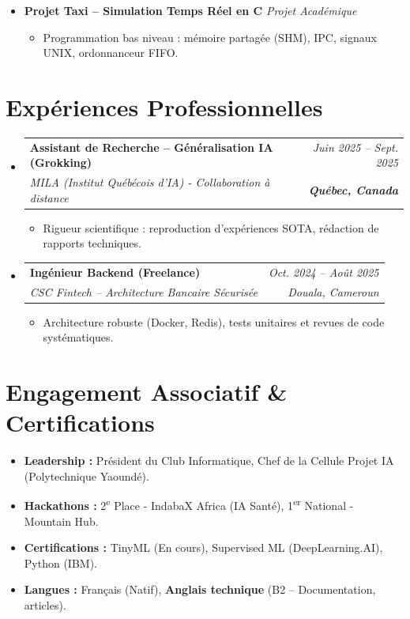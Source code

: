 \documentclass[a4paper,11pt]{article}
\makeatletter
\newcommand{\resumeSubheading}[4]{
  \vspace{-1pt}\item
    \begin{tabular*}{0.97\textwidth}[t]{l@{\extracolsep{\fill}}r}
      \textbf{#1} & \textit{\small #2} \\
      \textit{\small #3} & \textit{\small #4} \\
    \end{tabular*}\vspace{-5pt}
}
\makeatother
\begin{document}
\begin{itemize}[leftmargin=*, label={}]
\item \textbf{Projet Taxi -- Simulation Temps Réel en C} \hfill \textit{Projet Académique}
    \begin{itemize}[leftmargin=0.4cm, nosep, label=\tiny$\bullet$]
        \item \small{Programmation bas niveau : mémoire partagée (SHM), IPC, signaux UNIX, ordonnanceur FIFO.}
    \end{itemize}

\end{itemize}

\section{Expériences Professionnelles}
\begin{itemize}[leftmargin=*, label={}]

    \resumeSubheading
      {Assistant de Recherche -- Généralisation IA (Grokking)}{Juin 2025 -- Sept. 2025}
      {MILA (Institut Québécois d'IA) - Collaboration à distance}{\textbf{Québec, Canada}}
      \begin{itemize}[leftmargin=0.4cm, nosep, label=\tiny$\bullet$]
        \item \small{Rigueur scientifique : reproduction d'expériences SOTA, rédaction de rapports techniques.}
      \end{itemize}
    \vspace{2pt}

    \resumeSubheading
      {Ingénieur Backend (Freelance)}{Oct. 2024 -- Août 2025}
      {CSC Fintech -- Architecture Bancaire Sécurisée}{Douala, Cameroun}
      \begin{itemize}[leftmargin=0.4cm, nosep, label=\tiny$\bullet$]
        \item \small{Architecture robuste (Docker, Redis), tests unitaires et revues de code systématiques.}
      \end{itemize}
\end{itemize}

\section{Engagement Associatif \& Certifications}
\begin{itemize}[leftmargin=*, nosep]
    \item \textbf{Leadership :} Président du Club Informatique, Chef de la Cellule Projet IA (Polytechnique Yaoundé).
    \item \textbf{Hackathons :} 2\textsuperscript{e} Place - IndabaX Africa (IA Santé), 1\textsuperscript{er} National - Mountain Hub.
    \item \textbf{Certifications :} TinyML (En cours), Supervised ML (DeepLearning.AI), Python (IBM).
    \item \textbf{Langues :} Français (Natif), \textbf{Anglais technique} (B2 -- Documentation, articles).
\end{itemize}
\end{document}
